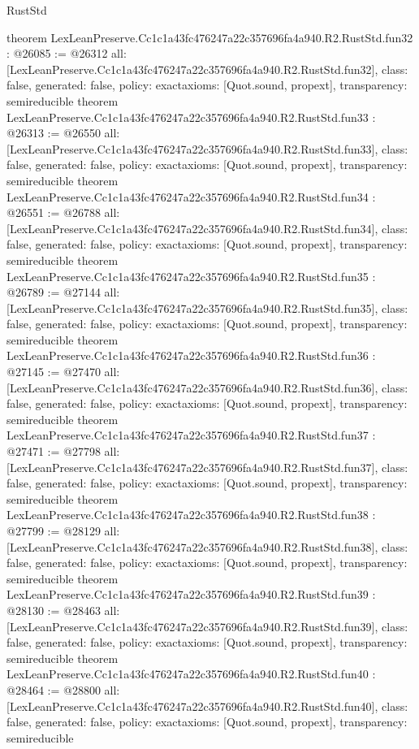 \begin{lexlean}{RustStd}
\begin{coremodule}
{}
theorem LexLeanPreserve.Cc1c1a43fc476247a22c357696fa4a940.R2.RustStd.fun32 : @26085 := @26312 {
  all: [LexLeanPreserve.Cc1c1a43fc476247a22c357696fa4a940.R2.RustStd.fun32],
  class: false,
  generated: false,
  policy: exact{axioms: [Quot.sound, propext]},
  transparency: semireducible
}
theorem LexLeanPreserve.Cc1c1a43fc476247a22c357696fa4a940.R2.RustStd.fun33 : @26313 := @26550 {
  all: [LexLeanPreserve.Cc1c1a43fc476247a22c357696fa4a940.R2.RustStd.fun33],
  class: false,
  generated: false,
  policy: exact{axioms: [Quot.sound, propext]},
  transparency: semireducible
}
theorem LexLeanPreserve.Cc1c1a43fc476247a22c357696fa4a940.R2.RustStd.fun34 : @26551 := @26788 {
  all: [LexLeanPreserve.Cc1c1a43fc476247a22c357696fa4a940.R2.RustStd.fun34],
  class: false,
  generated: false,
  policy: exact{axioms: [Quot.sound, propext]},
  transparency: semireducible
}
theorem LexLeanPreserve.Cc1c1a43fc476247a22c357696fa4a940.R2.RustStd.fun35 : @26789 := @27144 {
  all: [LexLeanPreserve.Cc1c1a43fc476247a22c357696fa4a940.R2.RustStd.fun35],
  class: false,
  generated: false,
  policy: exact{axioms: [Quot.sound, propext]},
  transparency: semireducible
}
theorem LexLeanPreserve.Cc1c1a43fc476247a22c357696fa4a940.R2.RustStd.fun36 : @27145 := @27470 {
  all: [LexLeanPreserve.Cc1c1a43fc476247a22c357696fa4a940.R2.RustStd.fun36],
  class: false,
  generated: false,
  policy: exact{axioms: [Quot.sound, propext]},
  transparency: semireducible
}
theorem LexLeanPreserve.Cc1c1a43fc476247a22c357696fa4a940.R2.RustStd.fun37 : @27471 := @27798 {
  all: [LexLeanPreserve.Cc1c1a43fc476247a22c357696fa4a940.R2.RustStd.fun37],
  class: false,
  generated: false,
  policy: exact{axioms: [Quot.sound, propext]},
  transparency: semireducible
}
theorem LexLeanPreserve.Cc1c1a43fc476247a22c357696fa4a940.R2.RustStd.fun38 : @27799 := @28129 {
  all: [LexLeanPreserve.Cc1c1a43fc476247a22c357696fa4a940.R2.RustStd.fun38],
  class: false,
  generated: false,
  policy: exact{axioms: [Quot.sound, propext]},
  transparency: semireducible
}
theorem LexLeanPreserve.Cc1c1a43fc476247a22c357696fa4a940.R2.RustStd.fun39 : @28130 := @28463 {
  all: [LexLeanPreserve.Cc1c1a43fc476247a22c357696fa4a940.R2.RustStd.fun39],
  class: false,
  generated: false,
  policy: exact{axioms: [Quot.sound, propext]},
  transparency: semireducible
}
theorem LexLeanPreserve.Cc1c1a43fc476247a22c357696fa4a940.R2.RustStd.fun40 : @28464 := @28800 {
  all: [LexLeanPreserve.Cc1c1a43fc476247a22c357696fa4a940.R2.RustStd.fun40],
  class: false,
  generated: false,
  policy: exact{axioms: [Quot.sound, propext]},
  transparency: semireducible
}
\end{coremodule}
\end{lexlean}
